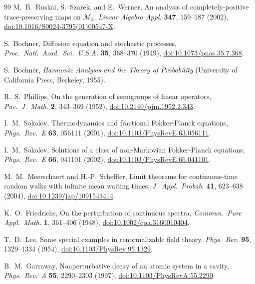\documentclass[twocolumn,10pt,amsmath,amssymb,floatfix]{revtex4-2}
\theoremstyle{plain}
\theoremstyle{definition}
\begin{document}
{\begin{thebibliography}{99}
M.~B.~Ruskai, S.~Szarek, and E.~Werner,
An analysis of completely-positive trace-preserving maps on $\mathcal{M}_2$,
\emph{Linear Algebra Appl.} \textbf{347}, 159--187 (2002),
\href{https://doi.org/10.1016/S0024-3795(01)00547-X}{doi:10.1016/S0024-3795(01)00547-X}.

S.~Bochner,
Diffusion equation and stochastic processes,
\emph{Proc.\ Natl.\ Acad.\ Sci.\ U.S.A.} \textbf{35}, 368--370 (1949),
\href{https://doi.org/10.1073/pnas.35.7.368}{doi:10.1073/pnas.35.7.368}.

S.~Bochner,
\emph{Harmonic Analysis and the Theory of Probability}
(University of California Press, Berkeley, 1955).

R.~S.~Phillips,
On the generation of semigroups of linear operators,
\emph{Pac.\ J.\ Math.} \textbf{2}, 343--369 (1952),
\href{https://doi.org/10.2140/pjm.1952.2.343}{doi:10.2140/pjm.1952.2.343}.

I.~M.~Sokolov,
Thermodynamics and fractional Fokker-Planck equations,
\emph{Phys.\ Rev.\ E} \textbf{63}, 056111 (2001),
\href{https://doi.org/10.1103/PhysRevE.63.056111}{doi:10.1103/PhysRevE.63.056111}.

I.~M.~Sokolov,
Solutions of a class of non-Markovian Fokker-Planck equations,
\emph{Phys.\ Rev.\ E} \textbf{66}, 041101 (2002),
\href{https://doi.org/10.1103/PhysRevE.66.041101}{doi:10.1103/PhysRevE.66.041101}.

M.~M.~Meerschaert and H.-P.~Scheffler,
Limit theorems for continuous-time random walks with infinite mean waiting times,
\emph{J.\ Appl.\ Probab.} \textbf{41}, 623--638 (2004),
\href{https://doi.org/10.1239/jap/1091543414}{doi:10.1239/jap/1091543414}.

K.~O.~Friedrichs,
On the perturbation of continuous spectra,
\emph{Commun.\ Pure Appl.\ Math.} \textbf{1}, 361--406 (1948),
\href{https://doi.org/10.1002/cpa.3160010404}{doi:10.1002/cpa.3160010404}.

T.~D.~Lee,
Some special examples in renormalizable field theory,
\emph{Phys.\ Rev.} \textbf{95}, 1329--1334 (1954),
\href{https://doi.org/10.1103/PhysRev.95.1329}{doi:10.1103/PhysRev.95.1329}.

B.~M.~Garraway,
Nonperturbative decay of an atomic system in a cavity,
\emph{Phys.\ Rev.\ A} \textbf{55}, 2290--2303 (1997),
\href{https://doi.org/10.1103/PhysRevA.55.2290}{doi:10.1103/PhysRevA.55.2290}.


\end{thebibliography}}
\end{document}
